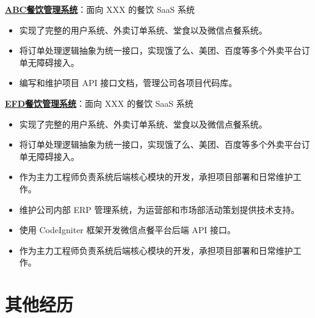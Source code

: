 \documentclass{resume}
\begin{document}
	\begin{leftenumerate}
		\item {\bfseries \href{https://lib.miaobai.net}{ABC餐饮管理系统}}：面向 XXX 的餐饮 SaaS 系统
		\begin{itemize}
			\item 实现了完整的用户系统、外卖订单系统、堂食以及微信点餐系统。
			\item 将订单处理逻辑抽象为统一接口，实现饿了么、美团、百度等多个外卖平台订单无障碍接入。
			\item 编写和维护项目 API 接口文档，管理公司各项目代码库。
		\end{itemize}
		\item {\bfseries \href{https://lib.miaobai.net}{EFD餐饮管理系统}}：面向 XXX 的餐饮 SaaS 系统
		\begin{itemize}
			\item 实现了完整的用户系统、外卖订单系统、堂食以及微信点餐系统。
			\item 将订单处理逻辑抽象为统一接口，实现饿了么、美团、百度等多个外卖平台订单无障碍接入。
			\item 作为主力工程师负责系统后端核心模块的开发，承担项目部署和日常维护工作。
		\end{itemize}
	\end{leftenumerate}	

	\begin{itemize}
		\item 维护公司内部 ERP 管理系统，为运营部和市场部活动策划提供技术支持。
		\item 使用 CodeIgniter 框架开发微信点餐平台后端 API 接口。
		\item 作为主力工程师负责系统后端核心模块的开发，承担项目部署和日常维护工作。
	\end{itemize}

	\section{其他经历}
\end{document}
